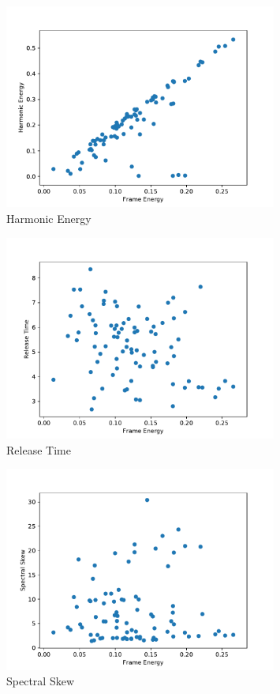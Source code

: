 \begin{figure}[H]
    \center
    \includegraphics[width = 0.8\textwidth]{Figures/harmonicErg}
    \caption{Harmonic Energy}
    \label{fig:im}
\end{figure}

\begin{figure}[H]
    \center
    \includegraphics[width = 0.8\textwidth]{Figures/rel.pdf}
    \caption{Release Time}
    \label{fig:im}
\end{figure}

\begin{figure}[H]
    \center
    \includegraphics[width = 0.8\textwidth]{Figures/specSkew.pdf}
    \caption{Spectral Skew}
    \label{fig:im}
\end{figure}

